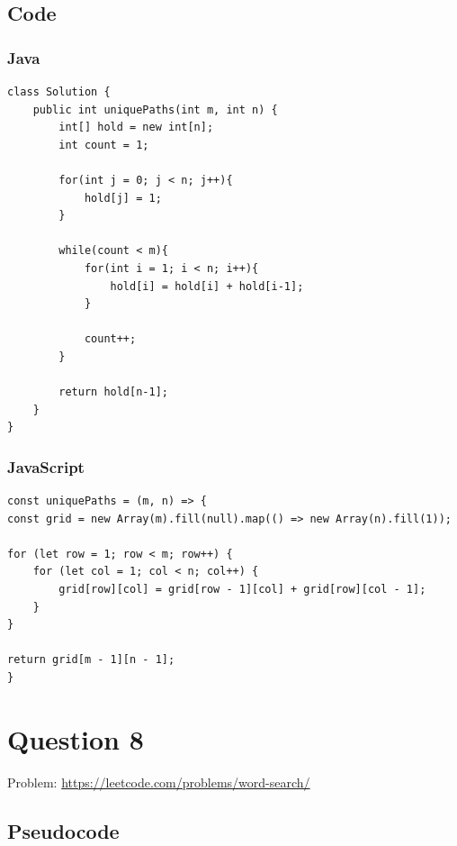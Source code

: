 \documentclass[11pt]{article}
\begin{document}
\subsection{Code}
\subsubsection{Java}

\begin{verbatim}
class Solution {
    public int uniquePaths(int m, int n) {
        int[] hold = new int[n];
        int count = 1;
        
        for(int j = 0; j < n; j++){
            hold[j] = 1;
        }

        while(count < m){
            for(int i = 1; i < n; i++){
                hold[i] = hold[i] + hold[i-1];
            }

            count++;
        }

        return hold[n-1];
    }
}
\end{verbatim}

\subsubsection{JavaScript}

\begin{verbatim}
const uniquePaths = (m, n) => {
const grid = new Array(m).fill(null).map(() => new Array(n).fill(1));

for (let row = 1; row < m; row++) {
    for (let col = 1; col < n; col++) {
        grid[row][col] = grid[row - 1][col] + grid[row][col - 1];
    }
}

return grid[m - 1][n - 1];
}
\end{verbatim}


\newpage

\section{Question 8}
Problem: \url{https://leetcode.com/problems/word-search/}

\subsection{Pseudocode}
\end{document}
